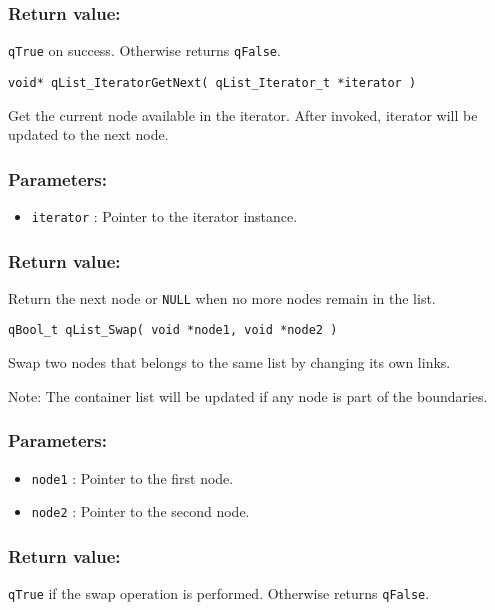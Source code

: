 \subsubsection*{Return value:}
\lstinline{qTrue} on success. Otherwise returns \lstinline{qFalse}. 

\noindent\hrulefill

\begin{lstlisting}[style=CStyle]
void* qList_IteratorGetNext( qList_Iterator_t *iterator )
\end{lstlisting} 

Get the current node available in the iterator. After invoked, iterator will be updated to the next node.

\subsubsection*{Parameters:}
\begin{itemize}
    \item \lstinline{iterator} : Pointer to the iterator instance. 
\end{itemize}

\subsubsection*{Return value:}
Return the next node or \lstinline{NULL} when no more nodes remain in the list. 

\noindent\hrulefill

\begin{lstlisting}[style=CStyle]
qBool_t qList_Swap( void *node1, void *node2 )
\end{lstlisting} 

Swap two nodes that belongs to the same list by changing its own links.

Note: The container list will be updated if any node is part of the boundaries.

\subsubsection*{Parameters:}
\begin{itemize}
    \item \lstinline{node1} : Pointer to the first node.
    \item \lstinline{node2} : Pointer to the second node.
\end{itemize}

\subsubsection*{Return value:}
\lstinline{qTrue} if the swap operation is performed. Otherwise returns \lstinline{qFalse}.
